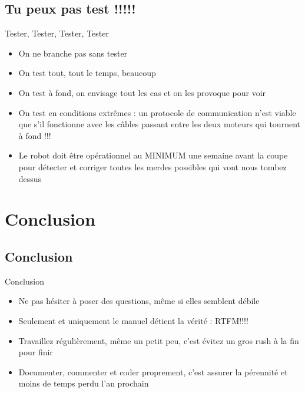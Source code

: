 \documentclass{beamer}
\begin{document}
\subsection{Tu peux pas test !!!!!}
\begin{frame}{Tester, Tester, Tester, Tester}
	\begin{itemize}
		\item On ne branche pas sans tester
		\item On test tout, tout le temps, beaucoup
		\item On test à fond, on envisage tout les cas et on les provoque pour voir
		\item On test en conditions extrêmes : un protocole de communication n'est viable que s'il fonctionne avec les câbles passant entre les deux moteurs qui tournent à fond !!!
		\item Le robot doit être opérationnel au MINIMUM une semaine avant la coupe pour détecter et corriger toutes les merdes possibles qui vont nous tombez dessus
	\end{itemize}
\end{frame}

\section{Conclusion}
\subsection{Conclusion}
\begin{frame}{Conclusion}
	\begin{itemize}
		\item Ne pas hésiter à poser des questions, même si elles semblent débile
		\item Seulement et uniquement le manuel détient la vérité : RTFM!!!!
		\item Travaillez régulièrement, même un petit peu, c'est évitez un gros rush à la fin pour finir
		\item Documenter, commenter et coder proprement, c'est assurer la pérennité et moins de temps perdu l'an prochain
	\end{itemize}
\end{frame}
\end{document}
